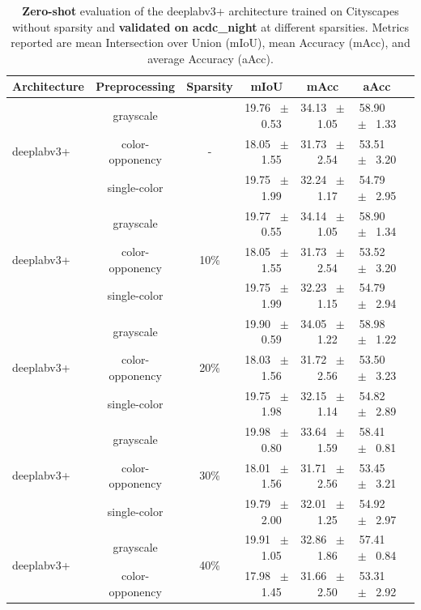 \begin{table}[h]
  \centering
  \caption{\textbf{Zero-shot} evaluation of the deeplabv3+ architecture trained on Cityscapes without sparsity and \textbf{validated on acdc_night} at different sparsities. Metrics reported are mean Intersection over Union (mIoU), mean Accuracy (mAcc), and average Accuracy (aAcc).}
  \begin{tabular}{@{}lccc ccc@{}}
    \toprule
    Architecture & Preprocessing & Sparsity & mIoU & mAcc & aAcc \\
    \midrule
    \multirow{3}{*}{deeplabv3+} & grayscale & \multirow{3}{*}{-} & 19.76 ~$\pm$~ 0.53 & 34.13 ~$\pm$~ 1.05 & 58.90 ~$\pm$~ 1.33 \\
    & color-opponency &  & 18.05 ~$\pm$~ 1.55 & 31.73 ~$\pm$~ 2.54 & 53.51 ~$\pm$~ 3.20 \\
    & single-color &  & 19.75 ~$\pm$~ 1.99 & 32.24 ~$\pm$~ 1.17 & 54.79 ~$\pm$~ 2.95 \\
    \midrule
    \multirow{3}{*}{deeplabv3+} & grayscale & \multirow{3}{*}{10\%} & 19.77 ~$\pm$~ 0.55 & 34.14 ~$\pm$~ 1.05 & 58.90 ~$\pm$~ 1.34 \\
    & color-opponency &  & 18.05 ~$\pm$~ 1.55 & 31.73 ~$\pm$~ 2.54 & 53.52 ~$\pm$~ 3.20 \\
    & single-color &  & 19.75 ~$\pm$~ 1.99 & 32.23 ~$\pm$~ 1.15 & 54.79 ~$\pm$~ 2.94 \\
    \midrule
    \multirow{3}{*}{deeplabv3+} & grayscale & \multirow{3}{*}{20\%} & 19.90 ~$\pm$~ 0.59 & 34.05 ~$\pm$~ 1.22 & 58.98 ~$\pm$~ 1.22 \\
    & color-opponency &  & 18.03 ~$\pm$~ 1.56 & 31.72 ~$\pm$~ 2.56 & 53.50 ~$\pm$~ 3.23 \\
    & single-color &  & 19.75 ~$\pm$~ 1.98 & 32.15 ~$\pm$~ 1.14 & 54.82 ~$\pm$~ 2.89 \\
    \midrule
    \multirow{3}{*}{deeplabv3+} & grayscale & \multirow{3}{*}{30\%} & 19.98 ~$\pm$~ 0.80 & 33.64 ~$\pm$~ 1.59 & 58.41 ~$\pm$~ 0.81 \\
    & color-opponency &  & 18.01 ~$\pm$~ 1.56 & 31.71 ~$\pm$~ 2.56 & 53.45 ~$\pm$~ 3.21 \\
    & single-color &  & 19.79 ~$\pm$~ 2.00 & 32.01 ~$\pm$~ 1.25 & 54.92 ~$\pm$~ 2.97 \\
    \midrule
    \multirow{3}{*}{deeplabv3+} & grayscale & \multirow{3}{*}{40\%} & 19.91 ~$\pm$~ 1.05 & 32.86 ~$\pm$~ 1.86 & 57.41 ~$\pm$~ 0.84 \\
    & color-opponency &  & 17.98 ~$\pm$~ 1.45 & 31.66 ~$\pm$~ 2.50 & 53.31 ~$\pm$~ 2.92 \\

\end{tabular}
\end{table}
